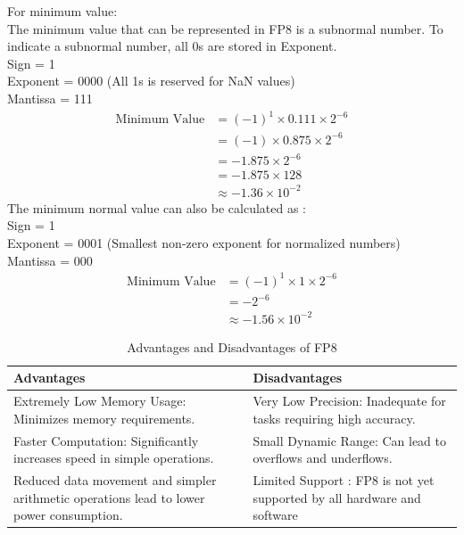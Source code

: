 \begin{enumerate}[label=\textbf{\roman*.}]
    For minimum value:\\
    The minimum value that can be represented in FP8 is a subnormal number. To indicate a subnormal number, all 0s are stored in Exponent. \\
    Sign = 1 \\
    Exponent = 0000 (All 1s is reserved for NaN values) \\
    Mantissa = 111 
    \[
    \begin{aligned}
        \text{Minimum Value} &= (-1)^{1} \times 0.111 \times 2^{-6} \\
        &= (-1) \times 0.875 \times 2^{-6} \\
        &= -1.875 \times 2^{-6} \\
        &= -1.875 \times 128 \\
        & \approx -1.36 \times 10^{-2}
    \end{aligned}
    \]
    The minimum normal value can also be calculated as : \\
    Sign = 1 \\
    Exponent = 0001 (Smallest non-zero exponent for normalized numbers)\\
    Mantissa = 000
    \[
        \begin{aligned}
            \text{Minimum Value} &= (-1)^{1} \times 1 \times 2^{-6} \\
            & =  -2^{-6} \\
            & \approx -1.56 \times 10^{-2}
        \end{aligned}
    \]

 
    \begin{table}[H]
        \centering
        \caption{Advantages and Disadvantages of FP8}
        \label{tab:fp8}
        \begin{tabular}{|p{6cm}|p{6cm}|}
        \hline
        \textbf{Advantages} & \textbf{Disadvantages} \\
        \hline
        Extremely Low Memory Usage: Minimizes memory requirements. & Very Low Precision: Inadequate for tasks requiring high accuracy. \\
        \hline
        Faster Computation: Significantly increases speed in simple operations. & Small Dynamic Range: Can lead to overflows and underflows. \\
        \hline
        Reduced data movement and simpler arithmetic operations lead to lower power consumption. & Limited Support : FP8 is not yet supported by all hardware and software \\
        \hline
        \end{tabular}
    \end{table}


\end{enumerate}
